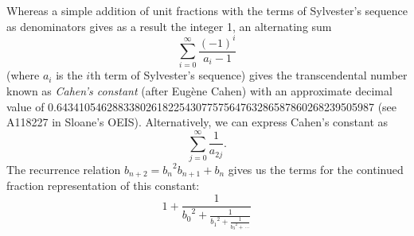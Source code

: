 \documentclass[12pt]{article}
\begin{document}
Whereas a simple addition of unit fractions with the terms of Sylvester's sequence as denominators gives as a result the integer 1, an alternating sum $$\sum_{i = 0}^\infty \frac{(-1)^i}{a_i - 1}$$ (where $a_i$ is the $i$th term of Sylvester's sequence) gives the transcendental number known as \emph{Cahen's constant} (after Eug\`ene Cahen) with an approximate decimal value of 0.643410546288338026182254307757564763286587860268239505987 (see A118227 in Sloane's OEIS). Alternatively, we can express Cahen's constant as $$\sum_{j = 0}^\infty \frac{1}{a_{2j}}.$$ The recurrence relation $b_{n + 2} = {b_n}^2b_{n + 1} + b_n$ gives us the terms for the continued fraction representation of this constant: $$1 + \frac{1}{{b_0}^2 + \frac{1}{{b_1}^2 + \frac{1}{{b_3}^2 + \, \cdots}}}$$
\end{document}
